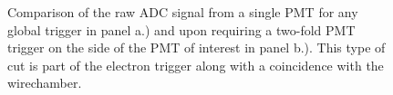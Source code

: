 \begin{figure}
  \centering
  \caption{Comparison of the raw ADC signal from a single PMT for any global trigger in panel a.) and upon requiring a two-fold PMT trigger
    on the side of the PMT of interest in panel b.). This type of cut is part of the electron trigger along with a coincidence with the wirechamber.}
  \label{fig:ADCsig}
\end{figure}

